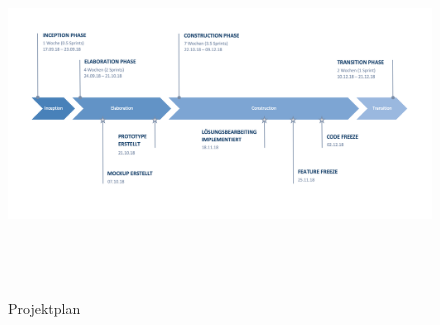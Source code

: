 \begin{landscape}
	\thispagestyle{empty}
	\label{subsec:timeline}
		\begin{figure}[h]
			\centering
			\includegraphics[width=1\linewidth, height=9.6cm]{img/projekt-plan/projekt-plan}
			\caption[Projektplan]{Projektplan}
			\label{fig:projekt-plan}
		\end{figure}
	\vspace{0.5cm}
	

	
	
	

\label{pdf:projekt-risiken}
\end{landscape}